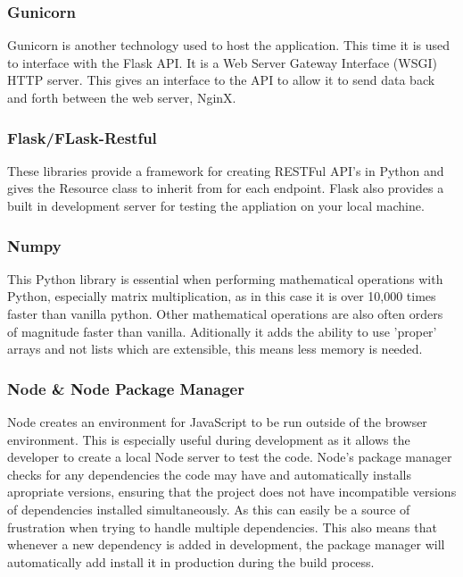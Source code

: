   \subsubsection{Gunicorn}
    Gunicorn is another technology used to host the application. This time it is used to interface with the Flask API. It is a Web Server Gateway Interface (WSGI) HTTP server. This gives an interface to the API to allow it to send data back and forth between the web server, NginX.
  \subsubsection{Flask/FLask-Restful}
    These libraries provide a framework for creating RESTFul API's in Python and gives the Resource class to inherit from for each endpoint. Flask also provides a built in development server for testing the appliation on your local machine.
  \subsubsection{Numpy}
    This Python library is essential when performing mathematical operations with Python, especially matrix multiplication, as in this case it is over 10,000 times faster than vanilla python. Other mathematical operations are also often orders of magnitude faster than vanilla. Aditionally it adds the ability to use 'proper' arrays and not lists which are extensible, this means less memory is needed.\citep{mediumAnuradaNumpy}
  \subsubsection{Node \& Node Package Manager}
    Node creates an environment for JavaScript to be run outside of the browser environment. This is especially useful during development as it allows the developer to create a local Node server to test the code. Node's package manager checks for any dependencies the code may have and automatically installs apropriate versions, ensuring that the project does not have incompatible versions of dependencies installed simultaneously. As this can easily be a source of frustration when trying to handle multiple dependencies. This also means that whenever a new dependency is added in development, the package manager will automatically add install it in production during the build process.

